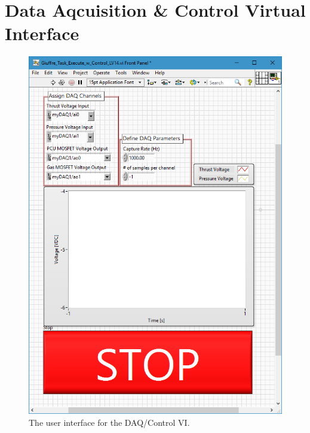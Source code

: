 \documentclass[journal]{IEEEtran}
\begin{document}
\section{Data Aqcuisition \& Control Virtual Interface}
\begin{figure}[htp]
  \includegraphics[height=.6\vsize,keepaspectratio]{figs/VI_30Mar17_FP.png}
  \caption{The user interface for the DAQ/Control VI.\@
\label{fig:VI-frontpanel}
}
\end{figure}
\end{document}
